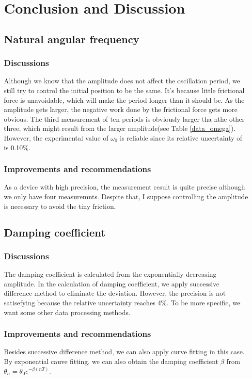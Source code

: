 \section{Conclusion and Discussion}

\subsection{Natural angular frequency}
\subsubsection{Discussions}
    Although we know that the amplitude does not affect the oscillation period, we still try to control the initial position to be the same. It's because little frictional force is unavoidable, which will make the period longer than it should be. As the amplitude gets larger, the negative work done by the frictional force gets more obvious. The third measurement of ten periods is obviously larger tha nthe other three, which might result from the larger amplitude(see Table \ref{data_omega}). However, the experimental value of $\omega_0$ is reliable since its relative uncertainty of is 0.10\%.

\subsubsection{Improvements and recommendations}
    As a device with high precision, the measurement result is quite precise although we only have four measuremnts. Despite that, I suppose controlling the amplitude is necessary to avoid the tiny friction.

\subsection{Damping coefficient}
\subsubsection{Discussions}
    The damping coefficient is calculated from the exponentially decreasing amplitude. In the calculation of damping coefficient, we apply successive difference method to eliminate the deviation. However, the precision is not satisefying because the relative uncertainty reaches 4\%. To be more specific, we want some other data processing methods.

\subsubsection{Improvements and recommendations}
	Besides successive difference method, we can also apply curve fitting in this case. By exponential cauve fitting, we can also obtain the damping coefficient $\beta$ from $\theta_n=\theta_0e^{-\beta (nT)}$.
	
